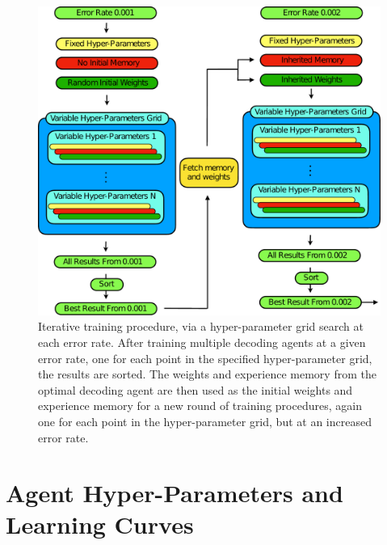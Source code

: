\documentclass[twocolumn,preprintnumbers,amsmath,amssymb,notitlepage,nofootinbib,longbibliography,superscriptaddress,aps,pra,10pt]{revtex4-1}
\begin{document}
	\begin{figure}
		\centering
		\includegraphics[width=\linewidth]{figures/iterative_training.pdf}
		\caption{
			Iterative training procedure, via a hyper-parameter grid search at each error rate.
			After training multiple decoding agents at a given error rate, one for each point in the specified hyper-parameter grid, the results are sorted.
			The weights and experience memory from the optimal decoding agent are then used as the initial weights and experience memory for a new round of training procedures, again one for each point in the hyper-parameter grid, but at an increased error rate.
		}
		\label{f:iterative_training}
	\end{figure}

\section{Agent Hyper-Parameters and Learning Curves}\label{A:parameters}
\end{document}
